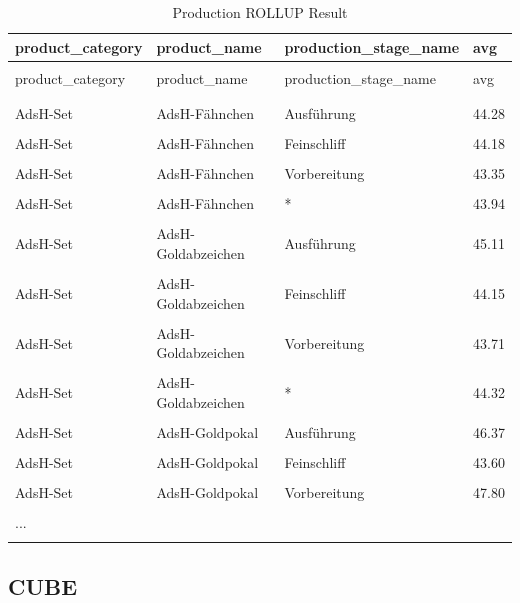 \documentclass[letterpaper,12pt]{article}
\begin{document}
\begingroup
\renewcommand\arraystretch{0.5}
\begin{longtable}{p{4cm}p{4cm}p{4cm}p{2cm}}
        \caption{Production ROLLUP Result} \\
	product\_category & product\_name & production\_stage\_name & avg \\
        \endfirsthead \\
        product\_category & product\_name & production\_stage\_name & avg \\
        \endhead \\
        \hline \\
        AdsH-Set & AdsH-Fähnchen & Ausführung & 44.28 \\
        \hline \\
        AdsH-Set & AdsH-Fähnchen & Feinschliff & 44.18 \\
        \hline \\
        AdsH-Set & AdsH-Fähnchen & Vorbereitung & 43.35 \\
        \hline \\
        AdsH-Set & AdsH-Fähnchen & * & 43.94 \\
        \hline \\
        AdsH-Set & AdsH-Goldabzeichen & Ausführung & 45.11 \\
        \hline \\
        AdsH-Set & AdsH-Goldabzeichen & Feinschliff & 44.15 \\
        \hline \\
        AdsH-Set & AdsH-Goldabzeichen & Vorbereitung & 43.71 \\
        \hline \\
        AdsH-Set & AdsH-Goldabzeichen & * & 44.32 \\
        \hline \\
        AdsH-Set & AdsH-Goldpokal & Ausführung & 46.37 \\
        \hline \\
        AdsH-Set & AdsH-Goldpokal & Feinschliff & 43.60 \\
        \hline \\
        AdsH-Set & AdsH-Goldpokal & Vorbereitung & 47.80 \\
        \hline \\
        ... \\
        \hline \\
\end{longtable} 
\endgroup

\subsection{CUBE}
\end{document}
